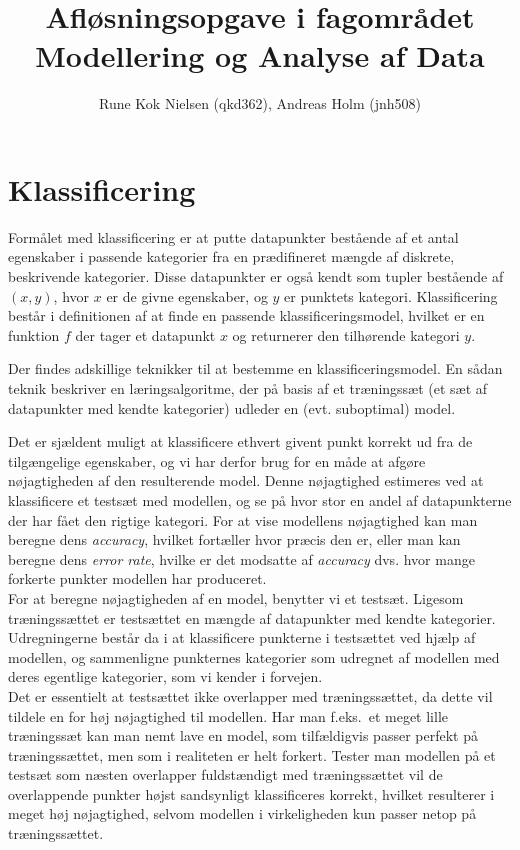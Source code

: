 \documentclass{article}
\author{Rune Kok Nielsen (qkd362), Andreas Holm (jnh508)}
\title{Afløsningsopgave i fagområdet Modellering og Analyse af Data}
\begin{document}
\maketitle

\section{Klassificering}
Formålet med klassificering er at putte datapunkter bestående af et antal egenskaber i passende kategorier fra en prædifineret mængde af diskrete, beskrivende kategorier. Disse datapunkter er også kendt som tupler bestående af $(x,y)$, hvor $x$ er de givne egenskaber, og $y$ er punktets kategori. Klassificering består i definitionen af at finde en passende klassificeringsmodel, hvilket er en funktion $f$ der tager et datapunkt $x$ og returnerer den tilhørende kategori $y$.

Der findes adskillige teknikker til at bestemme en klassificeringsmodel. En sådan teknik beskriver en læringsalgoritme, der på basis af et træningssæt (et sæt af datapunkter med kendte kategorier) udleder en (evt. suboptimal) model.

Det er sjældent muligt at klassificere ethvert givent punkt korrekt ud fra de tilgængelige egenskaber, og vi har derfor brug for en måde at afgøre nøjagtigheden af den resulterende model. Denne nøjagtighed estimeres ved at klassificere et testsæt med modellen, og se på hvor stor en andel af datapunkterne der har fået den rigtige kategori. For at vise modellens nøjagtighed kan man beregne dens \textit{accuracy}, hvilket fortæller hvor præcis den er, eller man kan beregne dens \textit{error rate}, hvilke er det modsatte af \textit{accuracy} dvs. hvor mange forkerte punkter modellen har produceret.\\
For at beregne nøjagtigheden af en model, benytter vi et testsæt. Ligesom træningssættet er testsættet en mængde af datapunkter med kendte kategorier. Udregningerne består da i at klassificere punkterne i testsættet ved hjælp af modellen, og sammenligne punkternes kategorier som udregnet af modellen med deres egentlige kategorier, som vi kender i forvejen.\\
Det er essentielt at testsættet ikke overlapper med træningssættet, da dette vil tildele en for høj nøjagtighed til modellen. Har man f.eks.\ et meget lille træningssæt kan man nemt lave en model, som tilfældigvis passer perfekt på træningssættet, men som i realiteten er helt forkert. Tester man modellen på et testsæt som næsten overlapper fuldstændigt med træningssættet vil de overlappende punkter højst sandsynligt klassificeres korrekt, hvilket resulterer i meget høj nøjagtighed, selvom modellen i virkeligheden kun passer netop på træningssættet. 
\end{document}
